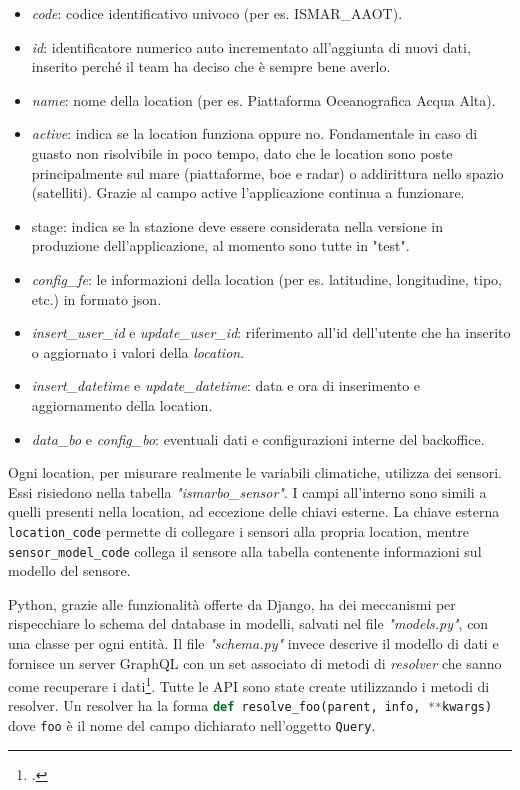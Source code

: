 \documentclass[./main.tex]{subfiles}
\begin{document}
\begin{itemize}
    \item \textit{code}: codice identificativo univoco (per es. ISMAR\_AAOT).
    \item \textit{id}: identificatore numerico auto incrementato all'aggiunta di nuovi dati, inserito perché il team ha deciso che è sempre bene averlo.
    \item \textit{name}: nome della location (per es. Piattaforma Oceanografica Acqua Alta).
    \item \textit{active}: indica se la location funziona oppure no. Fondamentale in caso di guasto non risolvibile in poco tempo, dato che le location sono poste principalmente sul mare (piattaforme, boe e radar) o addirittura nello spazio (satelliti). Grazie al campo active l'applicazione continua a funzionare.
    \item stage: indica se la stazione deve essere considerata nella versione in produzione dell'applicazione, al momento sono tutte in "test".
    \item \textit{config\_fe}: le informazioni della location (per es. latitudine, longitudine, tipo, etc.) in formato json.
    \item \textit{insert\_user\_id} e \textit{update\_user\_id}: riferimento all'id dell'utente che ha inserito o aggiornato i valori della \textit{location}.
    \item \textit{insert\_datetime} e \textit{update\_datetime}: data e ora di inserimento e aggiornamento della location.
    \item \textit{data\_bo} e \textit{config\_bo}: eventuali dati e configurazioni interne del backoffice.
\end{itemize}

Ogni location, per misurare realmente le variabili climatiche, utilizza dei sensori. Essi risiedono nella tabella \textit{"ismarbo\_sensor"}. I campi all'interno sono simili a quelli presenti nella location, ad eccezione delle chiavi esterne. La chiave esterna \lstinline{location_code} permette di collegare i sensori alla propria location, mentre \lstinline{sensor_model_code} collega il sensore alla tabella contenente informazioni sul modello del sensore.\par

Python, grazie alle funzionalità offerte da Django, ha dei meccanismi per rispecchiare lo schema del database in modelli, salvati nel file \textit{"models.py"}, con una classe per ogni entità. Il file \textit{"schema.py"} invece descrive il modello di dati e fornisce un server GraphQL con un set associato di metodi di \textit{resolver} che sanno come recuperare i dati\footcite[\url{https://docs.graphene-python.org/projects/django/en/latest/queries/}]{website-graphene-docs}. Tutte le API sono state create utilizzando i metodi di resolver. Un resolver ha la forma \lstinline[language=python]{def resolve_foo(parent, info, **kwargs)} 
dove \lstinline{foo} è il nome del campo dichiarato nell'oggetto \lstinline{Query}.\par
\end{document}
